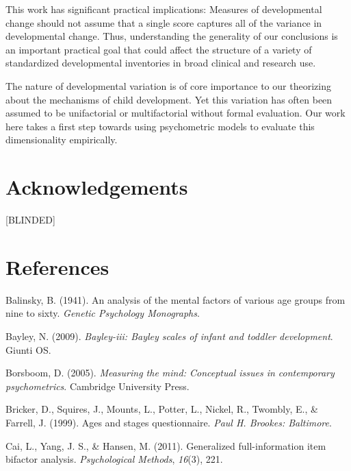 \documentclass[10pt, letterpaper]{article}
\begin{document}
This work has significant practical implications: Measures of
developmental change should not assume that a single score captures all
of the variance in developmental change. Thus, understanding the
generality of our conclusions is an important practical goal that could
affect the structure of a variety of standardized developmental
inventories in broad clinical and research use.

The nature of developmental variation is of core importance to our
theorizing about the mechanisms of child development. Yet this variation
has often been assumed to be unifactorial or multifactorial without
formal evaluation. Our work here takes a first step towards using
psychometric models to evaluate this dimensionality empirically.

\hypertarget{acknowledgements}{%
\section{Acknowledgements}\label{acknowledgements}}

{[}BLINDED{]}

\hypertarget{references}{%
\section{References}\label{references}}

\setlength{\parindent}{-0.1in} 
\setlength{\leftskip}{0.125in}

\noindent

\hypertarget{refs}{}
\leavevmode\hypertarget{ref-balinsky1941analysis}{}%
Balinsky, B. (1941). An analysis of the mental factors of various age
groups from nine to sixty. \emph{Genetic Psychology Monographs}.

\leavevmode\hypertarget{ref-bayley2009bayley}{}%
Bayley, N. (2009). \emph{Bayley-iii: Bayley scales of infant and toddler
development}. Giunti OS.

\leavevmode\hypertarget{ref-borsboom2005measuring}{}%
Borsboom, D. (2005). \emph{Measuring the mind: Conceptual issues in
contemporary psychometrics}. Cambridge University Press.

\leavevmode\hypertarget{ref-bricker1999ages}{}%
Bricker, D., Squires, J., Mounts, L., Potter, L., Nickel, R., Twombly,
E., \& Farrell, J. (1999). Ages and stages questionnaire. \emph{Paul H.
Brookes: Baltimore}.

\leavevmode\hypertarget{ref-cai2011generalized}{}%
Cai, L., Yang, J. S., \& Hansen, M. (2011). Generalized full-information
item bifactor analysis. \emph{Psychological Methods}, \emph{16}(3), 221.
\end{document}
